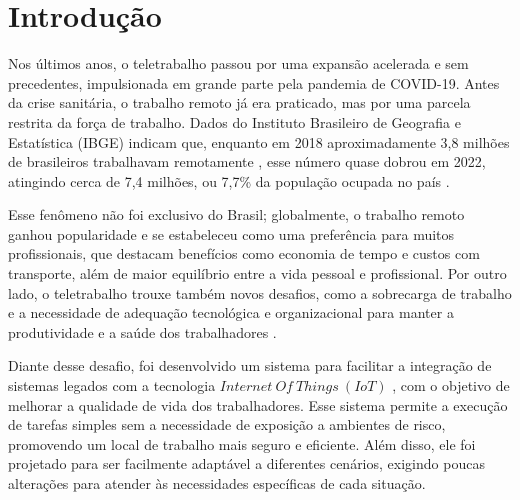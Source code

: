 \documentclass{ecatfg}
\begin{document}
\imprimirCabecalho
\imprimirResumo

	
\section{Introdução}
Nos últimos anos, o teletrabalho passou por uma expansão acelerada e sem precedentes, impulsionada em grande parte pela pandemia de COVID-19. Antes da crise sanitária, o trabalho remoto já era praticado, mas por uma parcela restrita da força de trabalho. Dados do Instituto Brasileiro de Geografia e Estatística (IBGE) indicam que, enquanto em 2018 aproximadamente 3,8 milhões de brasileiros trabalhavam remotamente \cite{ibge2018}, esse número quase dobrou em 2022, atingindo cerca de 7,4 milhões, ou 7,7\% da população ocupada no país \cite{ibge2022}.\par

Esse fenômeno não foi exclusivo do Brasil; globalmente, o trabalho remoto ganhou popularidade e se estabeleceu como uma preferência para muitos profissionais, que destacam benefícios como economia de tempo e custos com transporte, além de maior equilíbrio entre a vida pessoal e profissional. Por outro lado, o teletrabalho trouxe também novos desafios, como a sobrecarga de trabalho e a necessidade de adequação tecnológica e organizacional para manter a produtividade e a saúde dos trabalhadores \cite{oit}.\par

Diante desse desafio, foi desenvolvido um sistema para facilitar a integração de sistemas legados com a tecnologia $Internet\ Of\ Things\ (IoT)$ \cite{iot}, com o objetivo de melhorar a qualidade de vida dos trabalhadores. Esse sistema permite a execução de tarefas simples sem a necessidade de exposição a ambientes de risco, promovendo um local de trabalho mais seguro e eficiente. Além disso, ele foi projetado para ser facilmente adaptável a diferentes cenários, exigindo poucas alterações para atender às necessidades específicas de cada situação.\par
\end{document}
